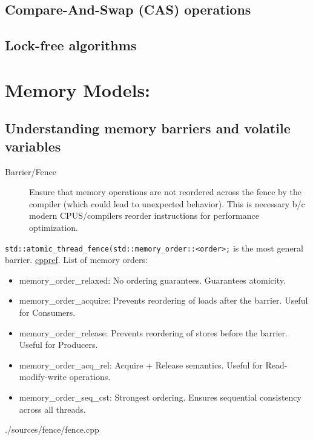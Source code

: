 \documentclass{article}
\begin{document}
    \subsection{ Compare-And-Swap (CAS) operations}
    \subsection{ Lock-free algorithms}
\section{Memory Models:}
    \subsection{ Understanding memory barriers and volatile variables}
      \begin{description}
        \item[Barrier/Fence]
          Ensure that memory operations are not reordered across the fence by the compiler (which could lead to unexpected behavior). This is necessary b/c modern CPUS/compilers reorder instructions for performance optimization.
      \end{description}
      \verb!std::atomic_thread_fence(std::memory_order::<order>;! is the most general barrier. \href{https://en.cppreference.com/w/cpp/atomic/atomic_thread_fence}{cppref}.
      List of memory orders:
      \begin{itemize}
        \item memory\_order\_relaxed: No ordering guarantees. Guarantees atomicity.
        \item memory\_order\_acquire: Prevents reordering of loads after the barrier. Useful for Consumers.
        \item memory\_order\_release: Prevents reordering of stores before the barrier. Useful for Producers.
        \item memory\_order\_acq\_rel: Acquire + Release semantics. Useful for Read-modify-write operations.
        \item memory\_order\_seq\_cst: Strongest ordering. Ensures sequential consistency across all threads.
      \end{itemize}
       {./sources/fence/fence.cpp}
\end{document}
